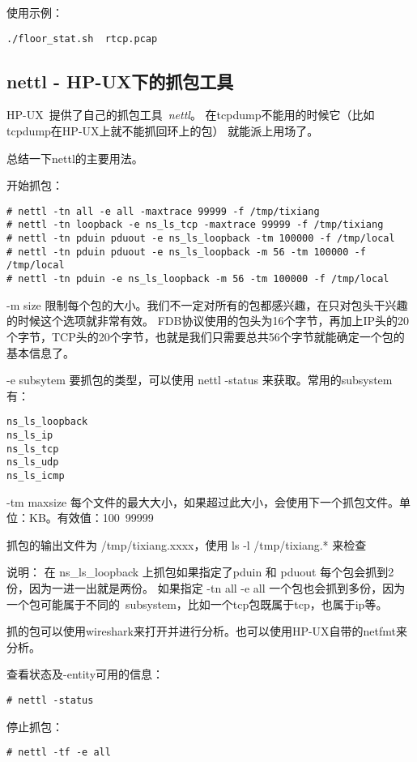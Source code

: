 使用示例：
\begin{lstlisting}
./floor_stat.sh  rtcp.pcap
\end{lstlisting}


\subsection{nettl - HP-UX下的抓包工具}
HP-UX~提供了自己的抓包工具~\emph{nettl}。
在tcpdump不能用的时候它（比如tcpdump在HP-UX上就不能抓回环上的包）
就能派上用场了。

总结一下nettl的主要用法。

开始抓包：
\begin{lstlisting}
# nettl -tn all -e all -maxtrace 99999 -f /tmp/tixiang
# nettl -tn loopback -e ns_ls_tcp -maxtrace 99999 -f /tmp/tixiang
# nettl -tn pduin pduout -e ns_ls_loopback -tm 100000 -f /tmp/local
# nettl -tn pduin pduout -e ns_ls_loopback -m 56 -tm 100000 -f /tmp/local
# nettl -tn pduin -e ns_ls_loopback -m 56 -tm 100000 -f /tmp/local
\end{lstlisting}

-m size 限制每个包的大小。我们不一定对所有的包都感兴趣，在只对包头干兴趣的时候这个选项就非常有效。
FDB协议使用的包头为16个字节，再加上IP头的20个字节，TCP头的20个字节，也就是我们只需要总共56个字节就能确定一个包的基本信息了。

-e subsytem 要抓包的类型，可以使用 nettl -status 来获取。常用的subsystem有：
\begin{lstlisting}
ns_ls_loopback
ns_ls_ip
ns_ls_tcp
ns_ls_udp
ns_ls_icmp
\end{lstlisting}

-tm maxsize 每个文件的最大大小，如果超过此大小，会使用下一个抓包文件。单位：KB。有效值：100~99999

抓包的输出文件为 /tmp/tixiang.xxxx，使用 ls -l /tmp/tixiang.* 来检查

说明：
在 ns\_ls\_loopback 上抓包如果指定了pduin 和 pduout 每个包会抓到2份，因为一进一出就是两份。
如果指定 -tn all -e all 一个包也会抓到多份，因为一个包可能属于不同的~subsystem，比如一个tcp包既属于tcp，也属于ip等。

抓的包可以使用wireshark来打开并进行分析。也可以使用HP-UX自带的netfmt来分析。

查看状态及-entity可用的信息：
\begin{lstlisting}
# nettl -status
\end{lstlisting}

停止抓包：
\begin{lstlisting}
# nettl -tf -e all
\end{lstlisting}

